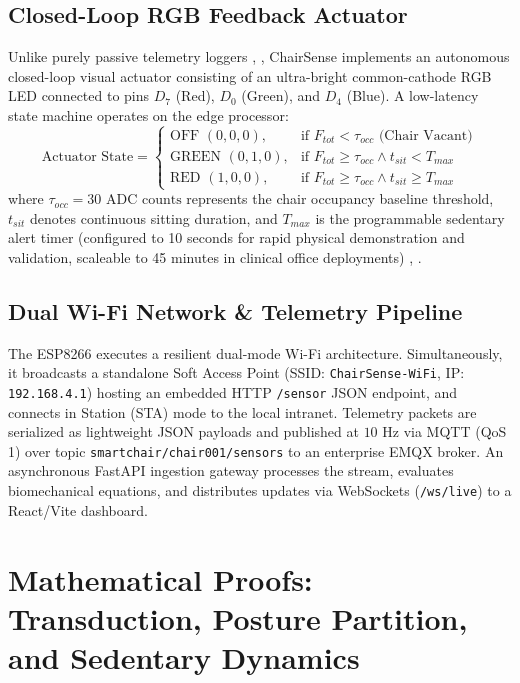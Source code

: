 \documentclass[conference]{IEEEtran}
\begin{document}
\subsection{Closed-Loop RGB Feedback Actuator}
Unlike purely passive telemetry loggers \cite{lee2022}, \cite{ganesh2017}, ChairSense implements an autonomous closed-loop visual actuator consisting of an ultra-bright common-cathode RGB LED connected to pins $D_7$ (Red), $D_0$ (Green), and $D_4$ (Blue). A low-latency state machine operates on the edge processor:
\begin{equation}
\text{Actuator State} = \begin{cases}
  \text{OFF } (0, 0, 0), & \text{if } F_{tot} < \tau_{occ} \text{ (Chair Vacant)} \\
  \text{GREEN } (0, 1, 0), & \text{if } F_{tot} \ge \tau_{occ} \land t_{sit} < T_{max} \\
  \text{RED } (1, 0, 0), & \text{if } F_{tot} \ge \tau_{occ} \land t_{sit} \ge T_{max}
\end{cases}
\label{eq:rgb_state}
\end{equation}
where $\tau_{occ} = 30\text{ ADC counts}$ represents the chair occupancy baseline threshold, $t_{sit}$ denotes continuous sitting duration, and $T_{max}$ is the programmable sedentary alert timer (configured to 10 seconds for rapid physical demonstration and validation, scaleable to 45 minutes in clinical office deployments) \cite{huang2016}, \cite{chandrasekaran2024qual}.

\subsection{Dual Wi-Fi Network \& Telemetry Pipeline}
The ESP8266 executes a resilient dual-mode Wi-Fi architecture. Simultaneously, it broadcasts a standalone Soft Access Point (SSID: \texttt{ChairSense-WiFi}, IP: \texttt{192.168.4.1}) hosting an embedded HTTP \texttt{/sensor} JSON endpoint, and connects in Station (STA) mode to the local intranet. Telemetry packets are serialized as lightweight JSON payloads and published at $10\text{ Hz}$ via MQTT (QoS 1) over topic \texttt{smartchair/chair001/sensors} to an enterprise EMQX broker. An asynchronous FastAPI ingestion gateway processes the stream, evaluates biomechanical equations, and distributes updates via WebSockets (\texttt{/ws/live}) to a React/Vite dashboard.

\section{Mathematical Proofs: Transduction, Posture Partition, and Sedentary Dynamics}
\end{document}
